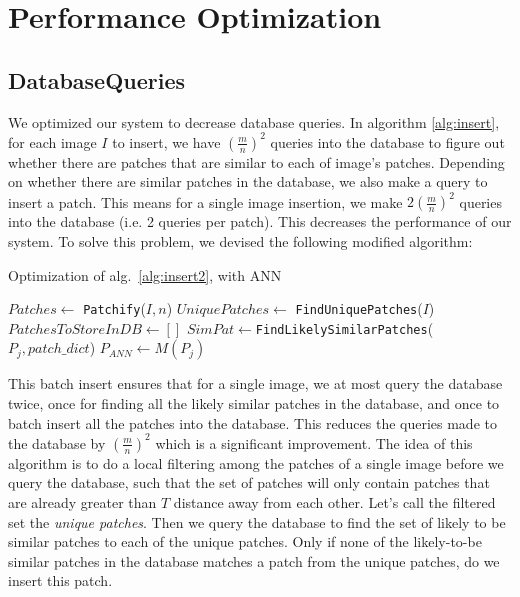 \section{Performance Optimization}



\subsection{DatabaseQueries}

We optimized our system to decrease database queries. In algorithm \ref{alg:insert}, for each image $I$ to insert, we have $\left(\frac{m}{n}\right)^2$ queries into the database to figure out whether there are patches that are similar to each of image's patches. Depending on whether there are similar patches in the database, we also make a query to insert a patch. This means for a single image insertion, we make $2\left(\frac{m}{n}\right)^2$ queries into the database (i.e. 2 queries per patch). This decreases the performance of our system. To solve this problem, we devised the following modified algorithm:

\begin{algorithm}
    \caption{Optimization of alg.~\ref{alg:insert2}, with ANN}
    \label{alg:optimized}
\begin{algorithmic}[1]
\State $Patches \leftarrow $ \texttt{Patchify}($I,n$)
\State $UniquePatches \leftarrow$ \texttt{FindUniquePatches}($I$)
\State $PatchesToStoreInDB \leftarrow []$
\State $SimPat \leftarrow $\texttt{FindLikelySimilarPatches}($P_j,patch\_dict$)
\State $P_{ANN} \leftarrow M(P_j)$
\EndIf
\EndFor
{}
\vspace{3mm}
\end{algorithmic}
\end{algorithm}

This batch insert ensures that for a single image, we at most query the database twice, once for finding all the likely similar patches in the database, and once to batch insert all the patches into the database. This reduces the queries made to the database by $\left(\frac{m}{n}\right)^2$ which is a significant improvement.
The idea of this algorithm is to do a local filtering among the patches of a single image before we query the database, such that the set of patches will only contain patches that are already greater than $T$ distance away from each other.  Let's call the filtered set the \emph{unique patches}. Then we query the database to find the set of likely to be similar patches to each of the unique patches. Only if none of the likely-to-be similar patches in the database matches a patch from the unique patches, do we insert this patch.
